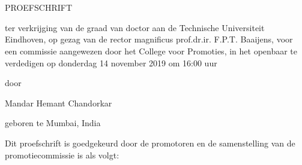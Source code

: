 \begin{titlepage}

\vspace*{1mm}
\begin{center}
    \huge
    \textbf{\doctitle \\}
    \Large
    \vspace*{5mm}
    \textit{\docsubtitle}\\
\end{center}

\vfill

\begin{center} 
    PROEFSCHRIFT
\end{center}
\vfill
\begin{center}
ter verkrijging van de graad van doctor aan de Technische Universiteit Eindhoven, op gezag van de 
rector magnificus prof.dr.ir. F.P.T. Baaijens, voor een commissie aangewezen door het College voor 
Promoties, in het openbaar te verdedigen op donderdag 14 november 2019 om 16:00 uur
\end{center}
\vfill
\begin{center} 
    door
\end{center}
\vfill
\begin{center}
    Mandar Hemant Chandorkar
\end{center}
\vfill
\begin{center}
    geboren te Mumbai, India
\end{center}

\clearpage

{\noindent
Dit proefschrift is goedgekeurd door de promotoren en de samenstelling van de promotiecommissie is 
als volgt:

\vspace{\baselineskip}
\noindent
{}

}
\end{titlepage}

